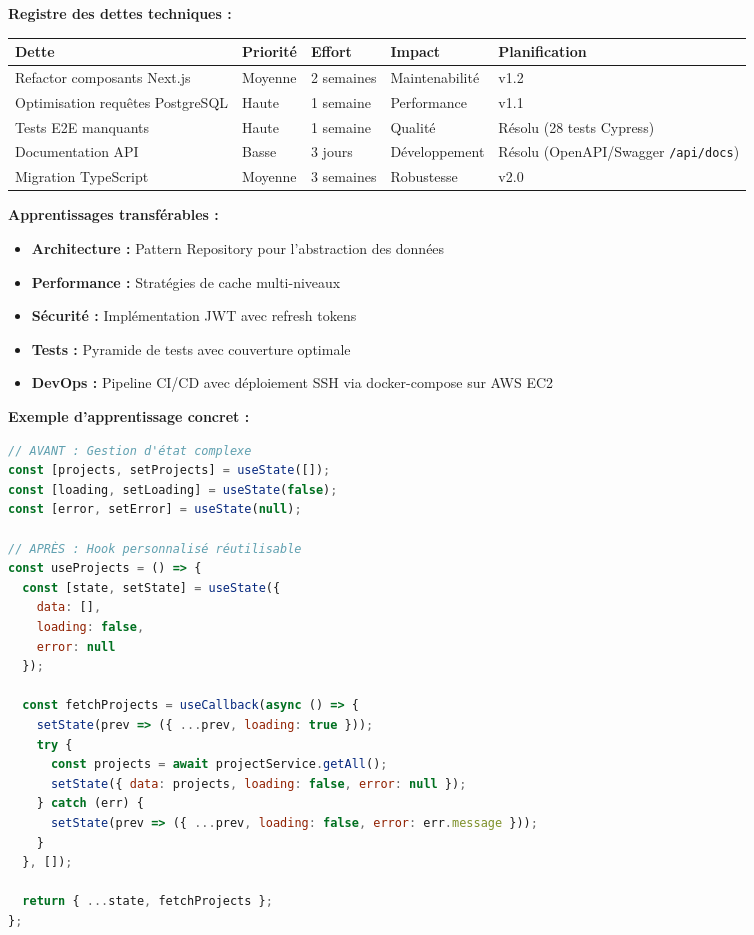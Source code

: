 \begin{exemple}
\textbf{Registre des dettes techniques :}
\begin{center}
\begin{tabular}{|l|l|l|l|l|}
\hline
\textbf{Dette} & \textbf{Priorité} & \textbf{Effort} & \textbf{Impact} & \textbf{Planification} \\
\hline
Refactor composants Next.js & Moyenne & 2 semaines & Maintenabilité & v1.2 \\
Optimisation requêtes PostgreSQL & Haute & 1 semaine & Performance & v1.1 \\
Tests E2E manquants & Haute & 1 semaine & Qualité & \mycheckmark{} Résolu (28 tests Cypress) \\
Documentation API & Basse & 3 jours & Développement & \mycheckmark{} Résolu (OpenAPI/Swagger \texttt{/api/docs}) \\
Migration TypeScript & Moyenne & 3 semaines & Robustesse & v2.0 \\
\hline
\end{tabular}
\end{center}

\textbf{Apprentissages transférables :}
\begin{itemize}
    \item \textbf{Architecture :} Pattern Repository pour l'abstraction des données
    \item \textbf{Performance :} Stratégies de cache multi-niveaux
    \item \textbf{Sécurité :} Implémentation JWT avec refresh tokens
    \item \textbf{Tests :} Pyramide de tests avec couverture optimale
    \item \textbf{DevOps :} Pipeline CI/CD avec déploiement SSH via docker-compose sur AWS EC2
\end{itemize}

\textbf{Exemple d'apprentissage concret :}
\begin{lstlisting}[language=JavaScript]
// AVANT : Gestion d'état complexe
const [projects, setProjects] = useState([]);
const [loading, setLoading] = useState(false);
const [error, setError] = useState(null);

// APRÈS : Hook personnalisé réutilisable
const useProjects = () => {
  const [state, setState] = useState({
    data: [],
    loading: false,
    error: null
  });

  const fetchProjects = useCallback(async () => {
    setState(prev => ({ ...prev, loading: true }));
    try {
      const projects = await projectService.getAll();
      setState({ data: projects, loading: false, error: null });
    } catch (err) {
      setState(prev => ({ ...prev, loading: false, error: err.message }));
    }
  }, []);

  return { ...state, fetchProjects };
};
\end{lstlisting}
\end{exemple}





